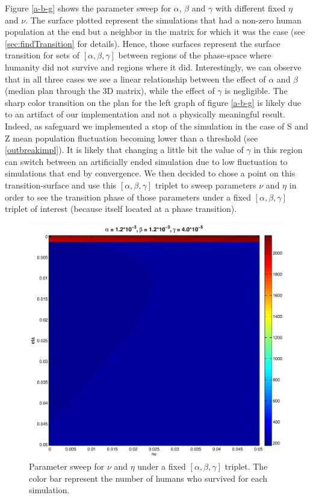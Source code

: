 \documentclass[11pt]{article} %
\begin{document}
Figure \ref{a-b-g} shows the parameter sweep for $\alpha$, $\beta$ and $\gamma$ with different fixed $\eta$ and $\nu$. The surface plotted represent the simulations that had a non-zero human population at the end but a neighbor in the matrix for which it was the case (see \ref{sec:findTransition} for details). Hence, those surfaces represent the surface transition for sets of $[\alpha, \beta, \gamma]$ between regions of the phase-space where humanity did not survive and regions where it did. Interestingly, we can observe that in all three cases we see a linear relationship between the effect of $\alpha$ and $\beta$ (median plan through the 3D matrix), while the effect of $\gamma$ is negligible. The sharp color transition on the plan for the left graph of figure \ref{a-b-g} is likely due to an artifact of our implementation and not a physically meaningful result. Indeed, as safeguard we implemented a stop of the simulation in the case of S and Z mean population fluctuation becoming lower than a threshold (see \ref{outbreakimpl}). It is likely that changing a little bit the value of $\gamma$ in this region can switch between an artificially ended simulation due to low fluctuation to simulations that end by convergence. We then decided to chose a point on this transition-surface and use this $[\alpha, \beta, \gamma]$ triplet to sweep parameters $\nu$ and $\eta$ in order to see the transition phase of those parameters under a fixed $[\alpha, \beta, \gamma]$ triplet of interest (because itself located at a phase transition).
\begin{figure}[h!]
\centerline{
\includegraphics[scale=0.33]{../images/Matlab_figures/nu-eta-sweep.eps}}
\caption{Parameter sweep for $\nu$ and $\eta$ under a fixed  $[\alpha, \beta, \gamma]$ triplet. The color bar represent the number of humans who survived for each simulation.  \label{nueta} }
\end{figure}
\end{document}
